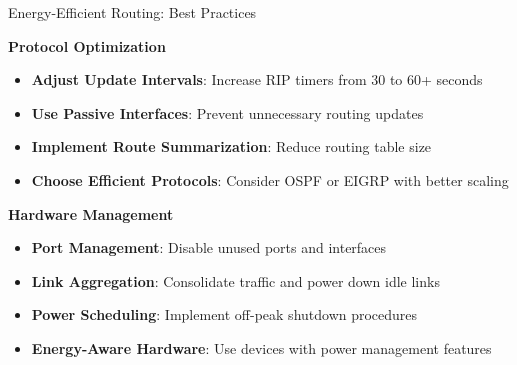 \documentclass{beamer}
\begin{document}
\begin{frame}{Energy-Efficient Routing: Best Practices}
    
    \textbf{Protocol Optimization}
    \begin{itemize}
        \item \textbf{Adjust Update Intervals}: Increase RIP timers from 30 to 60+ seconds
        \item \textbf{Use Passive Interfaces}: Prevent unnecessary routing updates
        \item \textbf{Implement Route Summarization}: Reduce routing table size
        \item \textbf{Choose Efficient Protocols}: Consider OSPF or EIGRP with better scaling
    \end{itemize}
    
    \vspace{0.4cm}
    
    \textbf{Hardware Management}
    \begin{itemize}
        \item \textbf{Port Management}: Disable unused ports and interfaces
        \item \textbf{Link Aggregation}: Consolidate traffic and power down idle links
        \item \textbf{Power Scheduling}: Implement off-peak shutdown procedures
        \item \textbf{Energy-Aware Hardware}: Use devices with power management features
    \end{itemize}
\end{frame}
\end{document}
